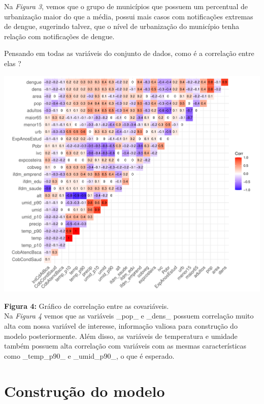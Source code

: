 \documentclass[12pt,a4paper]{article}\usepackage[]{graphicx}\usepackage[]{color}
\makeatletter
\def\maxwidth{ %
  \ifdim\Gin@nat@width>\linewidth
    \linewidth
  \else
    \Gin@nat@width
  \fi
}
\newenvironment{knitrout}{}{} %
\makeatother
\begin{document}
Na \emph{Figura 3}, vemos que o grupo de municípios que possuem um percentual de urbanização maior do que a média, possui mais casos com notificações extremas de dengue, sugerindo talvez, que o nível de urbanização do município tenha relação com notificações de dengue.

\newpage

Pensando em todas as variáveis do conjunto de dados, como é a correlação entre elas ?

\begin{knitrout}
\color{fgcolor}
\includegraphics[width=\maxwidth]{figure/unnamed-chunk-6-1} 

\end{knitrout}
\textbf{Figura 4:} Gráfico de correlação entre as covariáveis.\\

Na \emph{Figura 4} vemos que as variáveis \_pop\_ e \_dens\_ possuem correlação muito alta com nossa variável de interesse, informação valiosa para construção do modelo posteriormente. Além disso, as variáveis de temperatura e umidade também possuem alta correlação com variáveis com as mesmas características como \_temp\_p$90$\_ e \_umid\_p$90$\_, o que é esperado.

\newpage
\section{{\LARGE\textbf{Construção do modelo}}}
\end{document}
